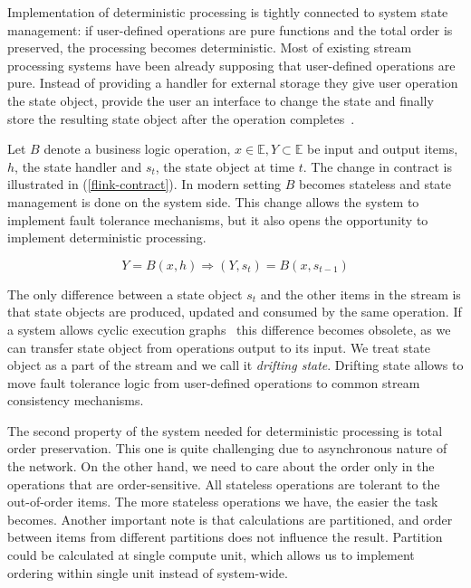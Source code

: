 
\label{motivation-section}

Implementation of deterministic processing is tightly connected to system state management: if user-defined operations are pure functions and the total order is preserved, the processing becomes deterministic. Most of existing stream processing systems have been already supposing that user-defined operations are pure. Instead of providing a handler for external storage they give user operation the state object, provide the user an interface to change the state and finally store the resulting state object after the operation completes~\cite{carbone2015apache, apache:storm, Noghabi:2017:SSS:3137765.3137770}.

Let $B$ denote a business logic operation, $x \in \mathbb{E}, Y \subset \mathbb{E}$ be input and output items, $h$, the state handler and $s_t$, the state object at time $t$. The change in contract is illustrated in (\ref{flink-contract}). In modern setting $B$ becomes stateless and state management is done on the system side. This change allows the system to implement fault tolerance mechanisms, but it also opens the opportunity to implement deterministic processing.

\begin{equation}
  \label{flink-contract}
  Y = B(x, h) \Rightarrow (Y, s_t) = B(x, s_{t-1}) 
\end{equation}

The only difference between a state object $s_t$ and the other items in the stream is that state objects are produced, updated and consumed by the same operation. If a system allows cyclic execution graphs~\cite{Murray:2013:NTD:2517349.2522738} this difference becomes obsolete, as we can transfer state object from operations output to its input. We treat state object as a part of the stream and we call it {\it drifting state}. Drifting state allows to move fault tolerance logic from user-defined operations to common stream consistency mechanisms.

The second property of the system needed for deterministic processing is total order preservation. This one is quite challenging due to asynchronous nature of the network. On the other hand, we need to care about the order only in the operations that are order-sensitive. All stateless operations are tolerant to the out-of-order items. The more stateless operations we have, the easier the task becomes. Another important note is that calculations are partitioned, and order between items from different partitions does not influence the result. Partition could be calculated at single compute unit, which allows us to implement ordering within single unit instead of system-wide.

